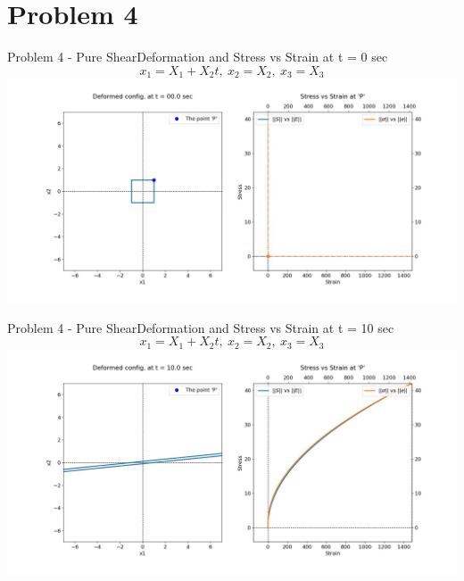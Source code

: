\documentclass{beamer}
\begin{document}
\section{Problem 4}

\begin{frame}{Problem 4 - Pure Shear}{Deformation and Stress vs Strain at t = 0 sec}
    \vspace{-1em}
    \scriptsize $$x_1 = X_1 + X_2t,\ x_2 = X_2,\ x_3 = X_3$$
    \includegraphics[width=\textwidth, trim={4.5cm 2cm 3cm 1cm}, clip]{Plots/ipureshear.jpg}
\end{frame}

\begin{frame}{Problem 4 - Pure Shear}{Deformation and Stress vs Strain at t = 10 sec}
    \vspace{-1em}
    \scriptsize $$x_1 = X_1 + X_2t,\ x_2 = X_2,\ x_3 = X_3$$
    \includegraphics[width=\textwidth, trim={4.5cm 2cm 3cm 1cm}, clip]{Plots/pureshear.jpg}
\end{frame}
\end{document}
